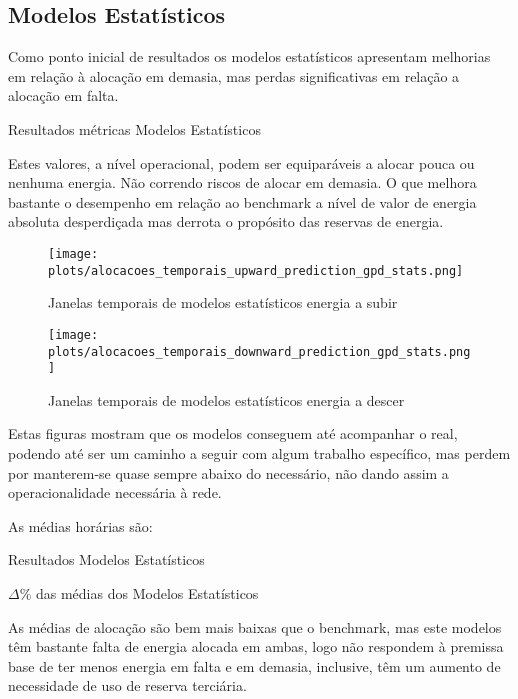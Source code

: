 \subsection{Modelos Estatísticos \label{se:resstats}}
Como ponto inicial de resultados os modelos estatísticos apresentam melhorias em relação à alocação em demasia, mas perdas significativas em relação a alocação em falta.\par

\begin{table}[H]
    \caption{Resultados métricas Modelos Estatísticos}    
    \resizebox{\linewidth}{!}{}
    \label{tab:statsmetrics}
    \end{table}

Estes valores, a nível operacional, podem ser equiparáveis a alocar pouca ou nenhuma energia. Não correndo riscos de alocar em demasia. O que melhora bastante o desempenho em relação ao benchmark a nível de valor de energia absoluta desperdiçada mas derrota o propósito das reservas de energia.\par

\begin{figure}[H]
    \centering
    \texttt{[image: plots/alocacoes\_temporais\_upward\_prediction\_gpd\_stats.png]}
    \caption{Janelas temporais de modelos estatísticos energia a subir}
    \label{fig:statstimewindowsup}
\end{figure}


\begin{figure}[H]
    \centering
    \texttt{[image: plots/alocacoes\_temporais\_downward\_prediction\_gpd\_stats.png]}
    \caption{Janelas temporais de modelos estatísticos energia a descer}
    \label{fig:statstimewindowsdown}
\end{figure}

Estas figuras mostram que os modelos conseguem até acompanhar o real, podendo até ser um caminho a seguir com algum trabalho específico, mas perdem por manterem-se quase sempre abaixo do necessário, não dando assim a operacionalidade necessária à rede.\par
As médias horárias são:\\
\begin{table}[H]
    \centering
    \resizebox{0.8\linewidth}{!}{}
    \caption{Resultados Modelos Estatísticos}
    \label{tab:statsres}
    \end{table}



\begin{table}[H]
    \centering
    \resizebox{\linewidth}{!}{}
    \caption{$\Delta$\% das médias dos Modelos Estatísticos}    
    \label{tab:statsres_deltas}
    \end{table}

As médias de alocação são bem mais baixas que o benchmark, mas este modelos têm bastante falta de energia alocada em ambas, logo não respondem à premissa base de ter menos energia em falta e em demasia, inclusive, têm um aumento de necessidade de uso de reserva terciária.\par
